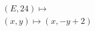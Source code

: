 \documentclass[preview]{standalone}
\begin{document}
\begin{align*}
(E,24) \mapsto \\ (x,y) \mapsto (x, -y + 2)
\end{align*}
\end{document}
